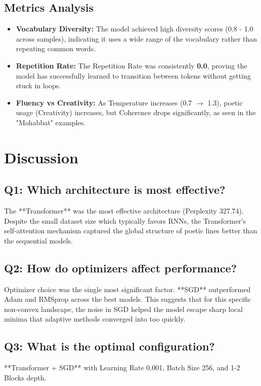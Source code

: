 \documentclass[12pt,a4paper]{article}
\begin{document}
\subsection{Metrics Analysis}
\begin{itemize}
    \item \textbf{Vocabulary Diversity:} The model achieved high diversity scores (0.8 - 1.0 across samples), indicating it uses a wide range of the vocabulary rather than repeating common words.
    \item \textbf{Repetition Rate:} The Repetition Rate was consistently \textbf{0.0}, proving the model has successfully learned to transition between tokens without getting stuck in loops.
    \item \textbf{Fluency vs Creativity:} As Temperature increases (0.7 $\to$ 1.3), poetic usage (Creativity) increases, but Coherence drops significantly, as seen in the "Mohabbat" examples.
\end{itemize}

\section{Discussion}

\subsection{Q1: Which architecture is most effective?}
The **Transformer** was the most effective architecture (Perplexity 327.74). Despite the small dataset size which typically favors RNNs, the Transformer's self-attention mechanism captured the global structure of poetic lines better than the sequential models.

\subsection{Q2: How do optimizers affect performance?}
Optimizer choice was the single most significant factor. **SGD** outperformed Adam and RMSprop across the best models. This suggests that for this specific non-convex landscape, the noise in SGD helped the model escape sharp local minima that adaptive methods converged into too quickly.

\subsection{Q3: What is the optimal configuration?}
**Transformer + SGD** with Learning Rate 0.001, Batch Size 256, and 1-2 Blocks depth.
\end{document}
